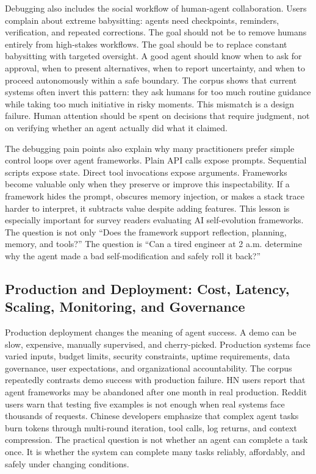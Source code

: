 Debugging also includes the social workflow of human-agent collaboration. Users complain about extreme babysitting: agents need checkpoints, reminders, verification, and repeated corrections. The goal should not be to remove humans entirely from high-stakes workflows. The goal should be to replace constant babysitting with targeted oversight. A good agent should know when to ask for approval, when to present alternatives, when to report uncertainty, and when to proceed autonomously within a safe boundary. The corpus shows that current systems often invert this pattern: they ask humans for too much routine guidance while taking too much initiative in risky moments. This mismatch is a design failure. Human attention should be spent on decisions that require judgment, not on verifying whether an agent actually did what it claimed.

The debugging pain points also explain why many practitioners prefer simple control loops over agent frameworks. Plain API calls expose prompts. Sequential scripts expose state. Direct tool invocations expose arguments. Frameworks become valuable only when they preserve or improve this inspectability. If a framework hides the prompt, obscures memory injection, or makes a stack trace harder to interpret, it subtracts value despite adding features. This lesson is especially important for survey readers evaluating AI self-evolution frameworks. The question is not only ``Does the framework support reflection, planning, memory, and tools?'' The question is ``Can a tired engineer at 2 a.m. determine why the agent made a bad self-modification and safely roll it back?''

\subsection{Production and Deployment: Cost, Latency, Scaling, Monitoring, and Governance}
\label{subsec:production-deployment}

Production deployment changes the meaning of agent success. A demo can be slow, expensive, manually supervised, and cherry-picked. Production systems face varied inputs, budget limits, security constraints, uptime requirements, data governance, user expectations, and organizational accountability. The corpus repeatedly contrasts demo success with production failure. HN users report that agent frameworks may be abandoned after one month in real production. Reddit users warn that testing five examples is not enough when real systems face thousands of requests. Chinese developers emphasize that complex agent tasks burn tokens through multi-round iteration, tool calls, log returns, and context compression. The practical question is not whether an agent can complete a task once. It is whether the system can complete many tasks reliably, affordably, and safely under changing conditions.

